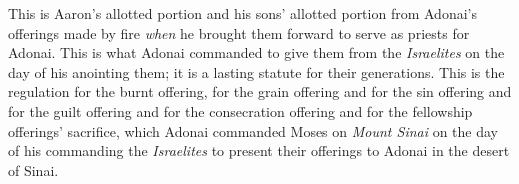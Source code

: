 \begin{biblechapter}
\verse This is Aaron’s allotted portion and his sons’ allotted portion from Adonai’s offerings made by fire \textit{when} he brought them forward to serve as priests for Adonai.
\verse This is what Adonai commanded to give them from the \textit{Israelites} on the day of his anointing them; it is a lasting statute for their generations.
 This is the regulation for the burnt offering, for the grain offering and for the sin offering and for the guilt offering and for the consecration offering and for the fellowship offerings’ sacrifice,
\verse which Adonai commanded Moses on \textit{Mount Sinai} on the day of his commanding the \textit{Israelites} to present their offerings to Adonai in the desert of Sinai.
\end{biblechapter}

